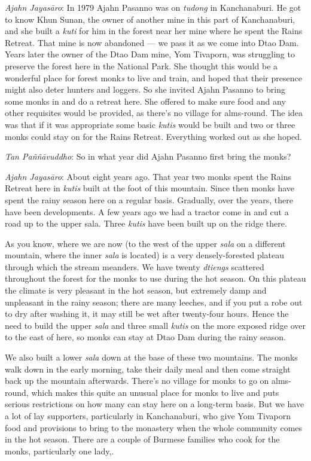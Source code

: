 \emph{Ajahn Jayasāro}: In 1979 Ajahn Pasanno was on \emph{tudong} in
Kanchanaburi. He got to know Khun Sunan, the owner of another mine in
this part of Kanchanaburi, and she built a \emph{kuti} for him in the
forest near her mine where he spent the Rains Retreat. That mine is now
abandoned --- we pass it as we come into Dtao Dam. Years later the owner
of the Dtao Dam mine, Yom Tivaporn, was struggling to preserve the
forest here in the National Park. She thought this would be a wonderful
place for forest monk\emph{s} to live and train, and hoped that their
presence might also deter hunters and loggers. So she invited Ajahn
Pasanno to bring some monks in and do a retreat here. She offered to
make sure food and any other requisites would be provided, as there's no
village for alms-round. The idea was that if it was appropriate some
basic \emph{kutis} would be built and two or three monks could stay on
for the Rains Retreat. Everything worked out as she hoped.

\emph{Tan Paññāvuddho}: So in what year did Ajahn Pasanno first bring
the monks?

\emph{Ajahn Jayasāro‎}: About eight years ago. That year two monks spent
the Rains Retreat here in \emph{kutis} built at the foot of this
mountain. Since then monks have spent the rainy season here on a regular
basis. Gradually, over the years, there have been developments. A few
years ago we had a tractor come in and cut a road up to the upper sala.
Three \emph{kutis} have been built up on the ridge there.

As you know, where we are now (to the west of the upper \emph{sala} on a
different mountain, where the inner \emph{sala} is located) is a very
densely-forested plateau through which the stream meanders. We have
twenty \emph{dtiengs} scattered throughout the forest for the monks to
use during the hot season. On this plateau the climate is very pleasant
in the hot season, but extremely damp and unpleasant in the rainy
season; there are many leeches, and if you put a robe out to dry after
washing it, it may still be wet after twenty-four hours. Hence the need
to build the upper \emph{sala} and three small \emph{kutis} on the more
exposed ridge over to the east of here, so monks can stay at Dtao Dam
during the rainy season.

We also built a lower \emph{sala} down at the base of these two
mountains. The monks walk down in the early morning, take their daily
meal and then come straight back up the mountain afterwards. There's no
village for monks to go on alms-round, which makes this quite an unusual
place for monks to live and puts serious restrictions on how many can
stay here on a long-term basis. But we have a lot of lay supporters,
particularly in Kanchanaburi, who give Yom Tivaporn food and provisions
to bring to the monastery when the whole community comes in the hot
season. There are a couple of Burmese families who cook for the monks,
particularly one lady,.

